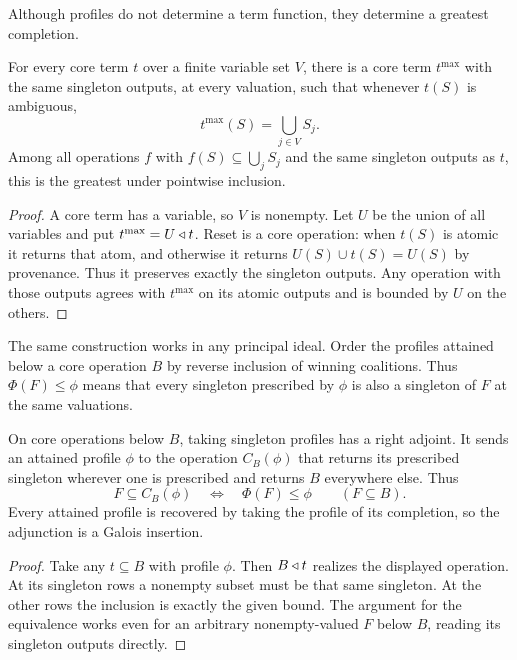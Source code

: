 Although profiles do not determine a term function, they determine a
greatest completion.

\begin{proposition}\label{core:prop:profile-maximum}
For every core term $t$ over a finite variable set $V$, there is a core
term $t^{\max}$ with the same singleton outputs, at every valuation, such
that whenever $t(S)$ is ambiguous,
\[
 t^{\max}(S)=\bigcup_{j\in V}S_j.
\]
Among all operations $f$ with $f(S)\subseteq\bigcup_jS_j$ and the same
singleton outputs as $t$, this is the greatest under pointwise inclusion.
\end{proposition}
\begin{proof}
A core term has a variable, so $V$ is nonempty. Let $U$ be the union of
all variables and put $t^{\max}=U\mathbin{\triangleleft} t$. Reset is a core operation:
when $t(S)$ is atomic it returns that atom, and otherwise it returns
$U(S)\cup t(S)=U(S)$ by provenance. Thus it preserves exactly the
singleton outputs. Any operation with those outputs agrees with
$t^{\max}$ on its atomic outputs and is bounded by $U$ on the others.
\end{proof}

The same construction works in any principal ideal. Order the profiles
attained below a core operation $B$ by reverse inclusion of winning
coalitions. Thus $\Phi(F)\le\phi$ means that every singleton prescribed
by $\phi$ is also a singleton of $F$ at the same valuations.

\begin{proposition}
\label{core:prop:relative-profile-maximum}
On core operations below $B$, taking singleton profiles has a right
adjoint. It sends an attained profile $\phi$ to the operation
$C_B(\phi)$ that returns its prescribed singleton wherever one is
prescribed and returns $B$ everywhere else. Thus
\[
 F\subseteq C_B(\phi)\quad\Longleftrightarrow\quad
 \Phi(F)\le\phi\qquad(F\subseteq B).
\]
Every attained profile is recovered by taking the profile of its
completion, so the adjunction is a Galois insertion.
\end{proposition}
\begin{proof}
Take any $t\subseteq B$ with profile $\phi$. Then $B\mathbin{\triangleleft} t$ realizes
the displayed operation. At its singleton rows a nonempty subset must
be that same singleton. At the other rows the inclusion is exactly
the given bound. The argument for the equivalence works even for an
arbitrary nonempty-valued $F$ below $B$, reading its singleton outputs
directly.
\end{proof}

